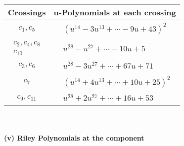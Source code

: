 \documentclass[1p]{elsarticle_modified}
\theoremstyle{definition}
\begin{document}
\begin{tabular}{m{50pt}|m{274pt}}
Crossings & \hspace{64pt}u-Polynomials at each crossing \\
\hline $$\begin{aligned}c_{1},c_{5}\end{aligned}$$&$\begin{aligned}
&(u^{14}-3 u^{13}+\cdots-9 u+43)^{2}
\end{aligned}$\\
\hline $$\begin{aligned}c_{2},c_{4},c_{8}\\c_{10}\end{aligned}$$&$\begin{aligned}
&u^{28}- u^{27}+\cdots-10 u+5
\end{aligned}$\\
\hline $$\begin{aligned}c_{3},c_{6}\end{aligned}$$&$\begin{aligned}
&u^{28}-3 u^{27}+\cdots+67 u+71
\end{aligned}$\\
\hline $$\begin{aligned}c_{7}\end{aligned}$$&$\begin{aligned}
&(u^{14}+4 u^{13}+\cdots+10 u+25)^{2}
\end{aligned}$\\
\hline $$\begin{aligned}c_{9},c_{11}\end{aligned}$$&$\begin{aligned}
&u^{28}+2 u^{27}+\cdots+16 u+53
\end{aligned}$\\
\hline
\end{tabular}\\~\\
\newpage\renewcommand{\arraystretch}{1}
\flushleft \textbf{(v) Riley Polynomials at the component}\newline \\
\end{document}
